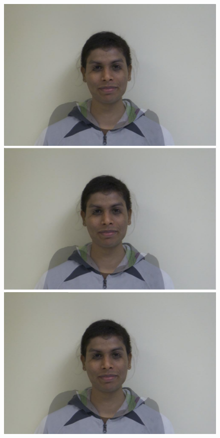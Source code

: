 \documentclass[11pt]{article}
\begin{document}
\begin{figure}[H]
\begin{center}
\includegraphics[scale=0.06]{figs/frames/morph_steinkirch_tangatur_37.jpg} 
\includegraphics[scale=0.06]{figs/frames/morph_steinkirch_tangatur_38.jpg} 
\includegraphics[scale=0.06]{figs/frames/morph_steinkirch_tangatur_39.jpg} 

\end{center}
\end{figure}
\end{document}
